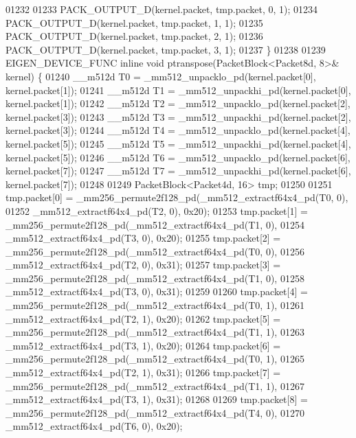 \begin{DoxyCode}
01232 
01233   PACK\_OUTPUT\_D(kernel.packet, tmp.packet, 0, 1);
01234   PACK\_OUTPUT\_D(kernel.packet, tmp.packet, 1, 1);
01235   PACK\_OUTPUT\_D(kernel.packet, tmp.packet, 2, 1);
01236   PACK\_OUTPUT\_D(kernel.packet, tmp.packet, 3, 1);
01237 \}
01238 
01239 EIGEN\_DEVICE\_FUNC \textcolor{keyword}{inline} \textcolor{keywordtype}{void} ptranspose(PacketBlock<Packet8d, 8>& kernel) \{
01240   \_\_m512d T0 = \_mm512\_unpacklo\_pd(kernel.packet[0], kernel.packet[1]);
01241   \_\_m512d T1 = \_mm512\_unpackhi\_pd(kernel.packet[0], kernel.packet[1]);
01242   \_\_m512d T2 = \_mm512\_unpacklo\_pd(kernel.packet[2], kernel.packet[3]);
01243   \_\_m512d T3 = \_mm512\_unpackhi\_pd(kernel.packet[2], kernel.packet[3]);
01244   \_\_m512d T4 = \_mm512\_unpacklo\_pd(kernel.packet[4], kernel.packet[5]);
01245   \_\_m512d T5 = \_mm512\_unpackhi\_pd(kernel.packet[4], kernel.packet[5]);
01246   \_\_m512d T6 = \_mm512\_unpacklo\_pd(kernel.packet[6], kernel.packet[7]);
01247   \_\_m512d T7 = \_mm512\_unpackhi\_pd(kernel.packet[6], kernel.packet[7]);
01248 
01249   PacketBlock<Packet4d, 16> tmp;
01250 
01251   tmp.packet[0] = \_mm256\_permute2f128\_pd(\_mm512\_extractf64x4\_pd(T0, 0),
01252                                          \_mm512\_extractf64x4\_pd(T2, 0), 0x20);
01253   tmp.packet[1] = \_mm256\_permute2f128\_pd(\_mm512\_extractf64x4\_pd(T1, 0),
01254                                          \_mm512\_extractf64x4\_pd(T3, 0), 0x20);
01255   tmp.packet[2] = \_mm256\_permute2f128\_pd(\_mm512\_extractf64x4\_pd(T0, 0),
01256                                          \_mm512\_extractf64x4\_pd(T2, 0), 0x31);
01257   tmp.packet[3] = \_mm256\_permute2f128\_pd(\_mm512\_extractf64x4\_pd(T1, 0),
01258                                          \_mm512\_extractf64x4\_pd(T3, 0), 0x31);
01259 
01260   tmp.packet[4] = \_mm256\_permute2f128\_pd(\_mm512\_extractf64x4\_pd(T0, 1),
01261                                          \_mm512\_extractf64x4\_pd(T2, 1), 0x20);
01262   tmp.packet[5] = \_mm256\_permute2f128\_pd(\_mm512\_extractf64x4\_pd(T1, 1),
01263                                          \_mm512\_extractf64x4\_pd(T3, 1), 0x20);
01264   tmp.packet[6] = \_mm256\_permute2f128\_pd(\_mm512\_extractf64x4\_pd(T0, 1),
01265                                          \_mm512\_extractf64x4\_pd(T2, 1), 0x31);
01266   tmp.packet[7] = \_mm256\_permute2f128\_pd(\_mm512\_extractf64x4\_pd(T1, 1),
01267                                          \_mm512\_extractf64x4\_pd(T3, 1), 0x31);
01268 
01269   tmp.packet[8] = \_mm256\_permute2f128\_pd(\_mm512\_extractf64x4\_pd(T4, 0),
01270                                          \_mm512\_extractf64x4\_pd(T6, 0), 0x20);

\end{DoxyCode}
